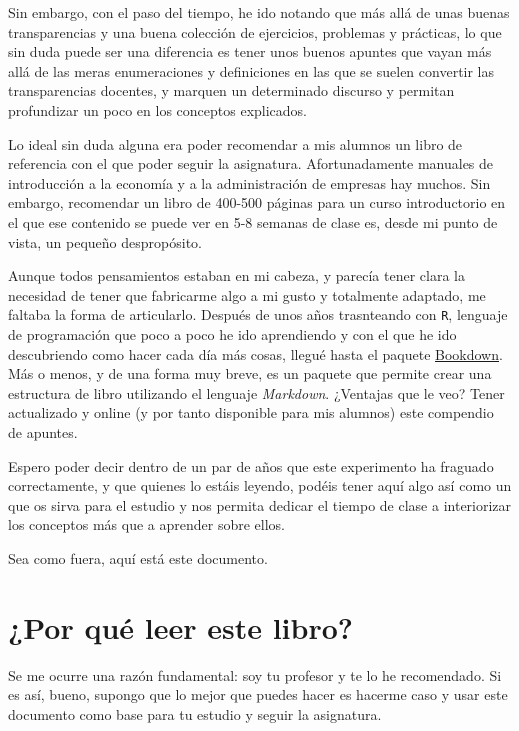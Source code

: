 \documentclass[
]{book}
\begin{document}
Sin embargo, con el paso del tiempo, he ido notando que más allá de unas buenas transparencias y una buena colección de ejercicios, problemas y prácticas, lo que sin duda puede ser una diferencia es tener unos buenos apuntes que vayan más allá de las meras enumeraciones y definiciones en las que se suelen convertir las transparencias docentes, y marquen un determinado discurso y permitan profundizar un poco en los conceptos explicados.

Lo ideal sin duda alguna era poder recomendar a mis alumnos un libro de referencia con el que poder seguir la asignatura. Afortunadamente manuales de introducción a la economía y a la administración de empresas hay muchos. Sin embargo, recomendar un libro de 400-500 páginas para un curso introductorio en el que ese contenido se puede ver en 5-8 semanas de clase es, desde mi punto de vista, un pequeño despropósito.

Aunque todos pensamientos estaban en mi cabeza, y parecía tener clara la necesidad de tener que fabricarme algo a mi gusto y totalmente adaptado, me faltaba la forma de articularlo. Después de unos años trasnteando con \texttt{R}, lenguaje de programación que poco a poco he ido aprendiendo y con el que he ido descubriendo como hacer cada día más cosas, llegué hasta el paquete \href{https://bookdown.org/}{Bookdown}. Más o menos, y de una forma muy breve, es un paquete que permite crear una estructura de libro utilizando el lenguaje \emph{Markdown}. ¿Ventajas que le veo? Tener actualizado y online (y por tanto disponible para mis alumnos) este compendio de apuntes.

Espero poder decir dentro de un par de años que este experimento ha fraguado correctamente, y que quienes lo estáis leyendo, podéis tener aquí algo así como un que os sirva para el estudio y nos permita dedicar el tiempo de clase a interiorizar los conceptos más que a aprender sobre ellos.

Sea como fuera, aquí está este documento.

\hypertarget{por-quuxe9-leer-este-libro}{%
\section*{¿Por qué leer este libro?}\label{por-quuxe9-leer-este-libro}}

Se me ocurre una razón fundamental: soy tu profesor y te lo he recomendado. Si es así, bueno, supongo que lo mejor que puedes hacer es hacerme caso y usar este documento como base para tu estudio y seguir la asignatura.
\end{document}

